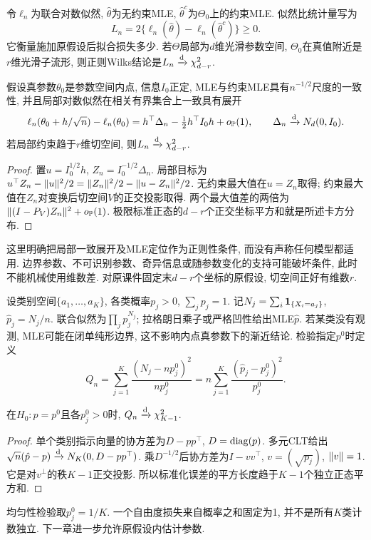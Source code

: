 令$\ell_n$为联合对数似然, $\hat\theta$为无约束MLE, $\hat\theta^c$为$\Theta_0$上的约束MLE. 似然比统计量写为
\[
 L_n=2\{\ell_n(\hat\theta)-\ell_n(\hat\theta^c)\}\geq0.
\]
它衡量施加原假设后拟合损失多少. 若$\Theta$局部为$d$维光滑参数空间, $\Theta_0$在真值附近是$r$维光滑子流形, 则正则Wilks结论是$L_n\xrightarrow{\mathrm d}\chi_{d-r}^2$.

\begin{theorem}[正则Wilks结论及其局部推导]
假设真参数$\theta_0$是参数空间内点, 信息$I_0$正定, MLE与约束MLE具有$n^{-1/2}$尺度的一致性, 并且局部对数似然在相关有界集合上一致具有展开
\[
 \ell_n(\theta_0+h/\sqrt n)-\ell_n(\theta_0)
 =h^\top\Delta_n-\tfrac12h^\top I_0h+o_{\mathbb P}(1),\qquad
 \Delta_n\xrightarrow{\mathrm d} N_d(0,I_0).
\]
若局部约束趋于$r$维切空间, 则$L_n\xrightarrow{\mathrm d}\chi_{d-r}^2$.
\end{theorem}
\begin{proof}
置$u=I_0^{1/2}h$, $Z_n=I_0^{-1/2}\Delta_n$. 局部目标为$u^\top Z_n-\lVert u\rVert^2/2=\lVert Z_n\rVert^2/2-\lVert u-Z_n\rVert^2/2$. 无约束最大值在$u=Z_n$取得; 约束最大值在$Z_n$对变换后切空间$V$的正交投影取得. 两个最大值差的两倍为$\lVert (I-P_V)Z_n\rVert^2+o_{\mathbb P}(1)$. 极限标准正态的$d-r$个正交坐标平方和就是所述卡方分布.
\end{proof}
这里明确把局部一致展开及MLE定位作为正则性条件, 而没有声称任何模型都适用. 边界参数、不可识别参数、奇异信息或随参数变化的支持可能破坏条件, 此时不能机械使用维数差. 对原课件固定末$d-r$个坐标的原假设, 切空间正好有维数$r$.

设类别空间$\{a_1,\ldots,a_K\}$, 各类概率$p_j>0$, $\sum_jp_j=1$. 记$N_j=\sum_i\mathbf 1_{\{X_i=a_j\}}$, $\hat p_j=N_j/n$. 联合似然为$\prod_jp_j^{N_j}$; 拉格朗日乘子或严格凹性给出MLE$\hat p$. 若某类没有观测, MLE可能在闭单纯形边界, 这不影响内点真参数下的渐近结论. 检验指定$p^0$时定义
\[
 Q_n=\sum_{j=1}^K\frac{(N_j-np_j^0)^2}{np_j^0}
 =n\sum_{j=1}^K\frac{(\hat p_j-p_j^0)^2}{p_j^0}.
\]
\begin{proposition}
在$H_0:p=p^0$且各$p_j^0>0$时, $Q_n\xrightarrow{\mathrm d}\chi_{K-1}^2$.
\end{proposition}
\begin{proof}
单个类别指示向量的协方差为$D-pp^\top$, $D=\operatorname{diag}(p)$. 多元CLT给出$\sqrt n(\hat p-p)\xrightarrow{\mathrm d} N_K(0,D-pp^\top)$. 乘$D^{-1/2}$后协方差为$I-vv^\top$, $v=(\sqrt{p_j})$, $\lVert v\rVert=1$. 它是对$v^\perp$的秩$K-1$正交投影. 所以标准化误差的平方长度趋于$K-1$个独立正态平方和.
\end{proof}
均匀性检验取$p_j^0=1/K$. 一个自由度损失来自概率之和固定为1, 并不是所有$K$类计数独立. 下一章进一步允许原假设内估计参数.

